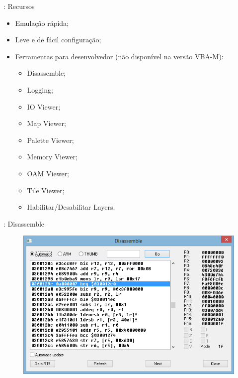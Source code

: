 \documentclass{beamer}
\begin{document}
\begin{darkframes}
\begin{frame}{\subsecname: Recursos}
    \begin{itemize}
        \item Emulação rápida;
        \item Leve e de fácil configuração;
        \item Ferramentas para desenvolvedor (não disponível na versão VBA-M):
            \begin{itemize}
                \item Disassemble;
                \item Logging;
                \item IO Viewer;
                \item Map Viewer;
                \item Palette Viewer;
                \item Memory Viewer;
                \item OAM Viewer;
                \item Tile Viewer;
                \item Habilitar/Desabilitar Layers.
            \end{itemize}
    \end{itemize}
\end{frame}

\begin{frame}{\subsecname: Disassemble}
    \begin{figure}
        \centering
        \includegraphics[width=1\textwidth,height=0.5\textheight,keepaspectratio]{disassemble}
    \end{figure}
\end{frame}


\end{darkframes}
\end{document}
